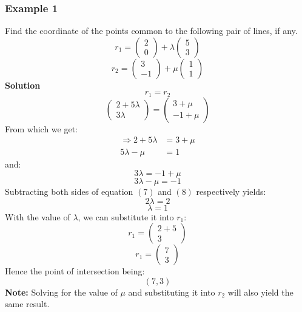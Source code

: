 \documentclass[hidelinks, a4paper, 12pt]{article}
\newcommand{\bd}{\textbf}
\newcommand{\thus}{\Rightarrow}
\begin{document}
            \subsubsection{Example 1}
                Find the coordinate of the points common to the following pair of lines, if any.
                \[r_1 = \begin{pmatrix} 2 \\ 0 \end{pmatrix} + \lambda \begin{pmatrix} 5 \\ 3 \end{pmatrix}\]
                \[r_2 = \begin{pmatrix} 3 \\ -1 \end{pmatrix} + \mu \begin{pmatrix} 1 \\ 1 \end{pmatrix}\]
                \bd{Solution}
                \[r_1 = r_2\]
                \[\begin{pmatrix} 2 + 5 \lambda \\ 3 \lambda \end{pmatrix} = \begin{pmatrix} 3 + \mu \\ -1 + \mu \end{pmatrix} \]
                From which we get:
                \begin{equation}
                    \begin{split}
                        \thus 2 + 5 \lambda &= 3 + \mu\\
                        5 \lambda - \mu &= 1
                    \end{split}
                \end{equation}
                and:
                \[3 \lambda = -1 + \mu\]
                \begin{equation}
                    3\lambda - \mu = - 1
                \end{equation}
                Subtracting both sides of equation $(7)$ and $(8)$ respectively yields:
                \[2\lambda = 2\]
                \[\lambda = 1\]
                With the value of $\lambda$, we can substitute it into $r_1$:
                \[r_1 = \begin{pmatrix} 2 + 5 \\ 3 \end{pmatrix}\] 
                \[r_1 = \begin{pmatrix} 7 \\ 3 \end{pmatrix}\]
                Hence the point of intersection being:
                \[(7, 3)\]
                \bd{Note: }Solving for the value of $\mu$ and substituting it into $r_2$ will also yield the same result.
\end{document}
